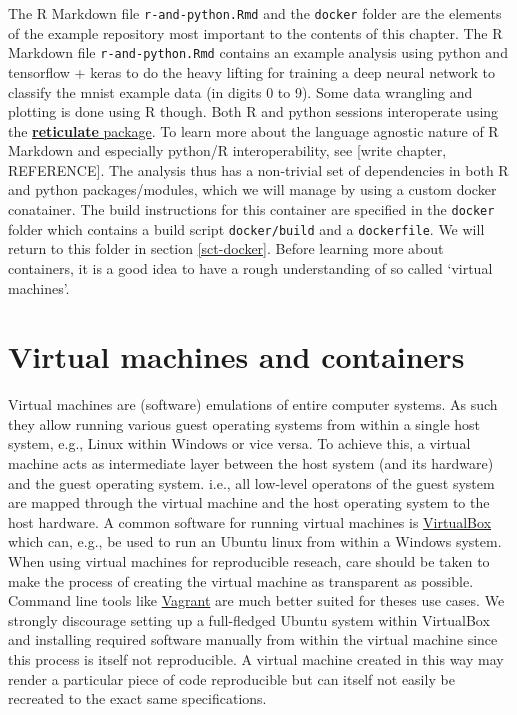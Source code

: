 \documentclass[]{book}
\begin{document}
The R Markdown file \texttt{r-and-python.Rmd} and the \texttt{docker}
folder are the elements of the example repository most important to the
contents of this chapter. The R Markdown file \texttt{r-and-python.Rmd}
contains an example analysis using python and tensorflow + keras to do
the heavy lifting for training a deep neural network to classify the
mnist example data (in digits 0 to 9). Some data wrangling and plotting
is done using R though. Both R and python sessions interoperate using
the \href{https://github.com/rstudio/reticulate}{\textbf{reticulate}
package}. To learn more about the language agnostic nature of R Markdown
and especially python/R interoperability, see {[}write chapter,
REFERENCE{]}. The analysis thus has a non-trivial set of dependencies in
both R and python packages/modules, which we will manage by using a
custom docker conatainer. The build instructions for this container are
specified in the \texttt{docker} folder which contains a build script
\texttt{docker/build} and a \texttt{dockerfile}. We will return to this
folder in section \ref{sct-docker}. Before learning more about
containers, it is a good idea to have a rough understanding of so called
`virtual machines'.

\section{Virtual machines and
containers}\label{virtual-machines-and-containers}

Virtual machines are (software) emulations of entire computer systems.
As such they allow running various guest operating systems from within a
single host system, e.g., Linux within Windows or vice versa. To achieve
this, a virtual machine acts as intermediate layer between the host
system (and its hardware) and the guest operating system. i.e., all
low-level operatons of the guest system are mapped through the virtual
machine and the host operating system to the host hardware. A common
software for running virtual machines is
\href{https://www.virtualbox.org/}{VirtualBox} which can, e.g., be used
to run an Ubuntu linux from within a Windows system. When using virtual
machines for reproducible reseach, care should be taken to make the
process of creating the virtual machine as transparent as possible.
Command line tools like \href{https://www.vagrantup.com/}{Vagrant} are
much better suited for theses use cases. We strongly discourage setting
up a full-fledged Ubuntu system within VirtualBox and installing
required software manually from within the virtual machine since this
process is itself not reproducible. A virtual machine created in this
way may render a particular piece of code reproducible but can itself
not easily be recreated to the exact same specifications.
\end{document}
